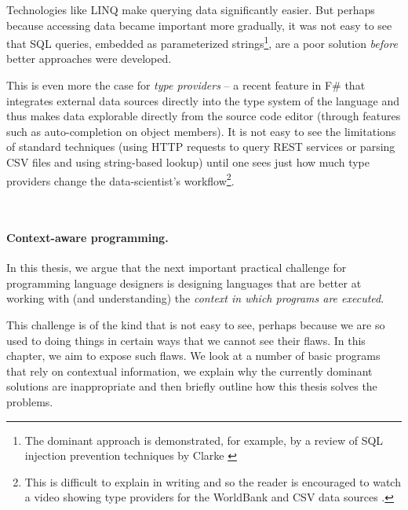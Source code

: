 Technologies like LINQ \cite{app-linq} make querying data significantly easier. But perhaps
because accessing data became important more gradually, it was not easy to see that SQL queries,
embedded as parameterized strings\footnote{The dominant approach is demonstrated, for example,
by a review of SQL injection prevention techniques by Clarke \cite{app-sql-injection}}, are a
poor solution \emph{before} better approaches were developed.

This is even more the case for \emph{type providers} -- a recent feature in F\# that integrates
external data sources directly into the type system of the language and thus makes data explorable
directly from the source code editor (through features such as auto-completion on object members).
It is not easy to see the limitations of standard techniques (using HTTP requests to query REST
services or parsing CSV files and using string-based lookup) until one sees just how much type
providers change the data-scientist's workflow\footnote{This is difficult to explain in writing
and so the reader is encouraged to watch a video showing type providers for the WorldBank and CSV
data sources \cite{app-fsharp-world}.}.

~\\

\paragraph{Context-aware programming.}

In this thesis, we argue that the next important practical challenge for programming language
designers is designing languages that are better at working with (and understanding) the
\emph{context in which programs are executed}.

This challenge is of the kind that is not easy to see, perhaps because we are so used to
doing things in certain ways that we cannot see their flaws. In this chapter, we aim to
expose such flaws. We look at a number of basic programs that rely on contextual
information, we explain why the currently dominant solutions are inappropriate and then
briefly outline how this thesis solves the problems.


%


